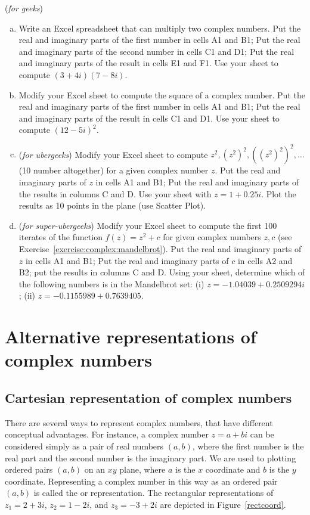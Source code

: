 \begin{exercise}\label{exercise:complex:excel} (\emph{for geeks})
\begin{enumerate}[(a)]
\item
Write an Excel spreadsheet that can multiply two complex numbers. Put the real and imaginary parts of the first number in cells A1 and B1; Put the real and imaginary parts of the second number in cells C1 and D1; Put the real and imaginary parts of the result in cells E1 and F1. Use your sheet to compute $(3 + 4i)(7 - 8i)$.
\item
Modify your Excel sheet to compute the square of a complex number. Put the real and imaginary parts of the first number in cells A1 and B1; Put the real and imaginary parts of the result in cells C1 and D1. Use your sheet to compute $(12 - 5i)^2$.
\item 
(\emph{for ubergeeks}) Modify your Excel sheet to compute $z^2, (z^2)^2,((z^2)^2)^2, \ldots$ (10 number altogether) for a given complex number $z$. Put the real and imaginary parts of $z$ in cells A1 and B1; Put the real and imaginary parts of the results in columns C and D. Use your sheet with $z = 1 + 0.25 i$. Plot the results as 10 points in the plane (use Scatter Plot).
\item
(\emph{for super-ubergeeks}) Modify your Excel sheet to compute the first 100 iterates of the function $f(z) = z^2 + c$ for given complex numbers $z,c$ (see Exercise~\ref{exercise:complex:mandelbrot}). Put the real and imaginary parts of $z$ in cells A1 and B1; Put the real and imaginary parts of $c$ in cells A2 and B2; put the results in columns C and D. Using your sheet, determine which of the following numbers is in the Mandelbrot set: (i) $z = -1.04039 + 0.2509294i$; (ii) $z=-0.1155989 + 0.7639405$.
\end{enumerate}
\end{exercise} 

\section{Alternative representations of complex numbers}\label{complex_graphical}
\subsection{Cartesian representation of complex numbers}
There are several ways to represent complex numbers, that have different conceptual advantages.
For instance, a complex number $z=a+bi$ can be considered simply as a pair of real numbers $(a,b)$, where the first number is the real part and the second number is the imaginary part. We are used to plotting ordered pairs $(a,b)$  on an $xy$ plane, where $a$ is the $x$ coordinate and $b$
is the $y$ coordinate. Representing a complex number in this way as an ordered pair $(a,b)$  is called the 
 or  representation. The rectangular
representations of $z_{1}=2+3i$, $z_{2}=1-2i$, and $z_{3}=-3+2i$
are depicted in Figure~\ref{rectcoord}.


